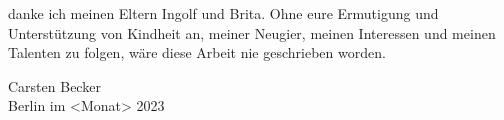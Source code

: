  danke ich meinen Eltern Ingolf und Brita. Ohne eure
Ermutigung und Unterstützung von Kindheit an, meiner Neugier, meinen Interessen
und meinen Talenten zu folgen, wäre diese Arbeit nie geschrieben worden.

\begin{flushright}
Carsten Becker\\
Berlin im <Monat> 2023
\end{flushright}
